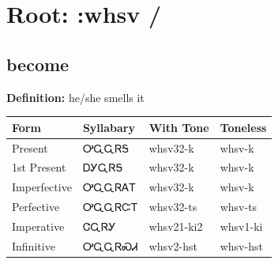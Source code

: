 \documentclass{article}%
\begin{document}
%
\normalsize%
\section*{Root: :whsv / }%
\subsection*{become}%
\textbf{Definition: }%
he/she smells it%
\\[0.5em]%
\begin{tabular}{|l|l|l|l|}%
\hline%
\textbf{Form}&\textbf{Syllabary}&\textbf{With Tone}&\textbf{Toneless}\\%
\hline%
Present&ᎤᏩᏩᏒᎦ&whsv32{-}k&whsv{-}k\\%
1st Present&ᎠᎩᏩᏒᎦ&whsv32{-}k&whsv{-}k\\%
Imperfective&ᎤᏩᏩᏒᎪᎢ&whsv32{-}k&whsv{-}k\\%
Perfective&ᎤᏩᏩᏒᏨᎢ&whsv32{-}ts&whsv{-}ts\\%
Imperative&ᏣᏩᏒᎩ&whsv21{-}ki2&whsv1{-}ki\\%
Infinitive&ᎤᏩᏩᏒᏍᏗ&whsv2{-}hst&whsv{-}hst\\%
\hline%
\end{tabular}%
\\[1em]%
\end{document}
